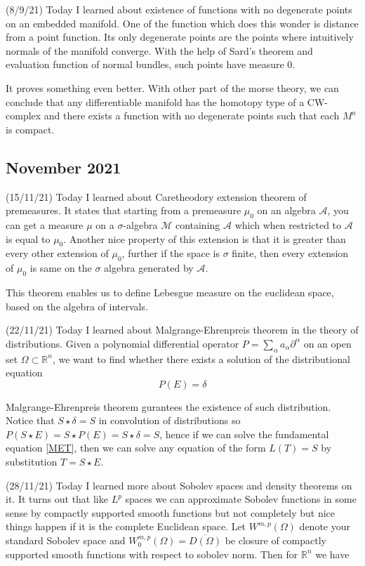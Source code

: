\documentclass[12pt,a4paper]{article}
\newcommand{\R}{\mathbb{R}}
\begin{document}
   
\quad (8/9/21) Today I learned about existence of functions with no degenerate points on an embedded manifold. One of the function which does this wonder is distance from a point function. Its only degenerate points are the points where intuitively normals of the manifold converge. With the help of Sard's theorem and evaluation function of normal bundles, such points have measure 0. 
   
It proves something even better. With other part of the morse theory, we can conclude that any differentiable manifold has the homotopy type of a CW-complex and there exists a function with no degenerate points such that each $M^a$ is compact.
   
\subsection*{November 2021}
   
   
\quad (15/11/21) Today I learned about Caretheodory extension theorem of premeasures. It states that starting from a premeasure  $\mu_0$ on an algebra $\mathcal{A}$, you can get a measure $\mu$ on a $\sigma$-algebra $\mathcal{M}$ containing $\mathcal{A}$ which when restricted to $\mathcal{A}$ is equal to $\mu_0$. Another nice property of this extension is that it is greater than every other extension of $\mu_0$, further if the space is $\sigma$ finite, then every extension of $\mu_0$ is same on the $\sigma$ algebra generated by $\mathcal{A}$.
   
This theorem enables us to define Lebesgue measure on the euclidean space, based on the algebra of intervals. 
   
(22/11/21)  Today I learned about Malgrange-Ehrenpreis theorem in the theory of distributions. Given a polynomial differential operator $P = \sum_{\alpha} a_\alpha\partial^{\alpha}$ on an open set $\Omega \subset \R^n$, we want to find whether there exists a solution of the distributional equation 
\begin{equation}
   P(E) = \delta \label{MET} 
\end{equation}
   
Malgrange-Ehrenpreis theorem gurantees the existence of such distribution. Notice that $S \star \delta = S$ in convolution of distributions so $P(S \star E ) = S \star P(E) = S \star \delta = S$, hence if we can solve the fundamental equation \eqref{MET}, then we can solve any equation of the form $L(T) = S$ by substitution $T = S \star E$.
   
(28/11/21) Today I learned more about Sobolev spaces and density theorems on it. It turns out that like $L^p$ spaces we can approximate Sobolev functions in some sense by compactly supported smooth functions but not completely but nice things happen if it is the complete Euclidean space. Let $W^{m,p}(\Omega)$ denote your standard Sobolev space and $W^{m,p}_0(\Omega) = \overline{D(\Omega)}$ be closure of compactly supported smooth functions with respect to sobolev norm. Then for $\R^n$ we have 
   
\end{document}
